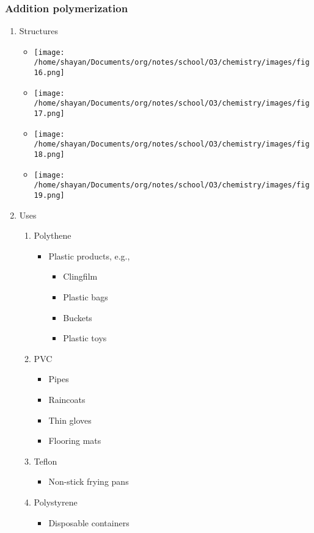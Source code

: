 \documentclass[11pt]{article}
\begin{document}
\subsubsection{Addition polymerization}
\label{sec:org20fe7a2}
\begin{enumerate}
\item Structures
\label{sec:org8eb6cb8}
\begin{itemize}
\item \begin{center}
\texttt{[image: /home/shayan/Documents/org/notes/school/O3/chemistry/images/fig16.png]}
\end{center}
\item \begin{center}
\texttt{[image: /home/shayan/Documents/org/notes/school/O3/chemistry/images/fig17.png]}
\end{center}
\item \begin{center}
\texttt{[image: /home/shayan/Documents/org/notes/school/O3/chemistry/images/fig18.png]}
\end{center}
\item \begin{center}
\texttt{[image: /home/shayan/Documents/org/notes/school/O3/chemistry/images/fig19.png]}
\end{center}
\end{itemize}
\item Uses
\label{sec:orgfc8304e}
\begin{enumerate}
\item Polythene
\label{sec:orgc744ea7}
\begin{itemize}
\item Plastic products, e.g.,
\begin{itemize}
\item Clingfilm
\item Plastic bags
\item Buckets
\item Plastic toys
\end{itemize}
\end{itemize}
\item PVC
\label{sec:org55bf2ab}
\begin{itemize}
\item Pipes
\item Raincoats
\item Thin gloves
\item Flooring mats
\end{itemize}
\item Teflon
\label{sec:org2ade443}
\begin{itemize}
\item Non-stick frying pans
\end{itemize}
\item Polystyrene
\label{sec:org8009d75}
\begin{itemize}
\item Disposable containers
\end{itemize}
\end{enumerate}
\end{enumerate}
\end{document}
